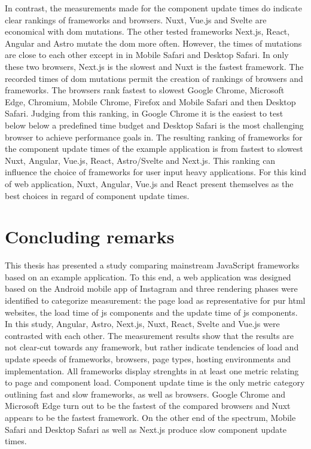 \documentclass[a4paper, 12pt]{article}
\begin{document}
In contrast, the measurements made for the component update times do indicate clear rankings of frameworks and browsers.
Nuxt, Vue.js and Svelte are economical with \acrshort{dom} mutations.
The other tested frameworks Next.js, React, Angular and Astro mutate the \acrshort{dom} more often.
However, the times of mutations are close to each other except in in Mobile Safari and Desktop Safari.
In only these two browsers, Next.js is the slowest and Nuxt is the fastest framework.
The recorded times of \acrshort{dom} mutations permit the creation of rankings of browsers and frameworks.
The browsers rank fastest to slowest Google Chrome, Microsoft Edge, Chromium, Mobile Chrome, Firefox and Mobile Safari and then Desktop Safari.
Judging from this ranking, in Google Chrome it is the easiest to test below below a predefined time budget and Desktop Safari is the most challenging browser to achieve performance goals in.
The resulting ranking of frameworks for the component update times of the example application is from fastest to slowest Nuxt, Angular, Vue.js, React, Astro/Svelte and Next.js.
This ranking can influence the choice of frameworks for user input heavy applications.
For this kind of web application, Nuxt, Angular, Vue.js and React present themselves as the best choices in regard of component update times.

\section{Concluding remarks}\label{sec:conclusion}

This thesis has presented a study comparing mainstream JavaScript frameworks based on an example application.
To this end, a web application was designed based on the Android mobile app of Instagram and three rendering phases were identified to categorize measurement: the page load as representative for pur \acrshort{html} websites, the load time of \acrlong{js} components and the update time of \acrlong{js} components.
In this study, Angular, Astro, Next.js, Nuxt, React, Svelte and Vue.js were contrasted with each other.
The measurement results show that the results are not clear-cut towards any framework, but rather indicate tendencies of load and update speeds of frameworks, browsers, page types, hosting environments and implementation.
All frameworks display strenghts in at least one metric relating to page and component load.
Component update time is the only metric category outlining fast and slow frameworks, as well as browsers.
Google Chrome and Microsoft Edge turn out to be the fastest of the compared browsers and Nuxt appears to be the fastest framework.
On the other end of the spectrum, Mobile Safari and Desktop Safari as well as Next.js produce slow component update times.
\end{document}
